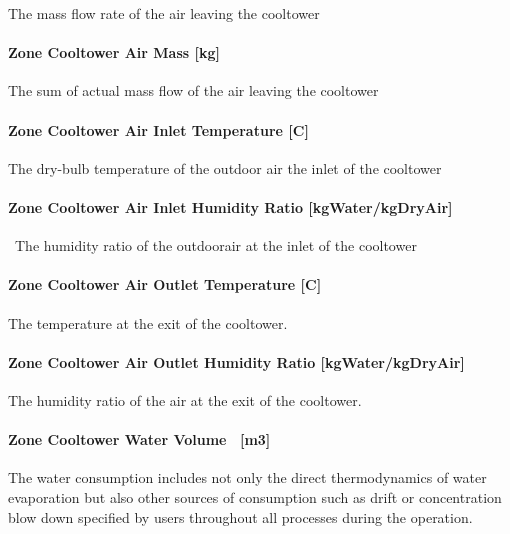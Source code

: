 The mass flow rate of the air leaving the cooltower

\paragraph{Zone Cooltower Air Mass {[}kg{]}}\label{zone-cooltower-air-mass-kg}

The sum of actual mass flow of the air leaving the cooltower

\paragraph{Zone Cooltower Air Inlet Temperature {[}C{]}}\label{zone-cooltower-air-inlet-temperature-c}

The dry-bulb temperature of the outdoor air the inlet of the cooltower

\paragraph{Zone Cooltower Air Inlet Humidity Ratio {[}kgWater/kgDryAir{]}}\label{zone-cooltower-air-inlet-humidity-ratio-kgwaterkgdryair}

~The humidity ratio of the outdoorair at the inlet of the cooltower

\paragraph{Zone Cooltower Air Outlet Temperature {[}C{]}}\label{zone-cooltower-air-outlet-temperature-c}

The temperature at the exit of the cooltower.

\paragraph{Zone Cooltower Air Outlet Humidity Ratio {[}kgWater/kgDryAir{]}}\label{zone-cooltower-air-outlet-humidity-ratio-kgwaterkgdryair}

The humidity ratio of the air at the exit of the cooltower.

\paragraph{Zone Cooltower Water Volume ~{[}m3{]}}\label{zone-cooltower-water-volume-m3}

The water consumption includes not only the direct thermodynamics of water evaporation but also other sources of consumption such as drift or concentration blow down specified by users throughout all processes during the operation.


